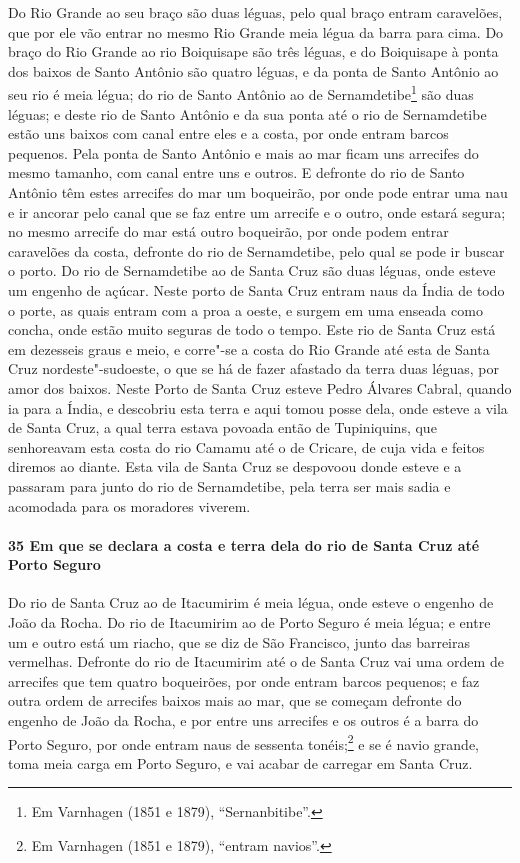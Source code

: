 Do Rio Grande ao seu braço são duas léguas, pelo qual braço entram caravelões, que por ele
vão entrar no mesmo Rio Grande meia légua da barra para cima. Do braço do Rio Grande ao
rio Boiquisape são três léguas, e do Boiquisape à ponta dos baixos de Santo Antônio são
quatro léguas, e da ponta de Santo Antônio ao seu rio é meia légua; do rio de Santo
Antônio ao de Sernamdetibe\footnote{ Em Varnhagen (1851 e 1879), ``Sernanbitibe''.} são
duas léguas; e deste rio de Santo Antônio e da sua ponta até o rio de Sernamdetibe estão
uns baixos com canal entre eles e a costa, por onde entram barcos pequenos. Pela ponta de
Santo Antônio e mais ao mar ficam uns arrecifes do mesmo tamanho, com canal entre uns e
outros. E defronte do rio de Santo Antônio têm estes arrecifes do mar um boqueirão, por
onde pode entrar uma nau e ir ancorar pelo canal que se faz entre um arrecife e o outro,
onde estará segura; no mesmo arrecife do mar está outro boqueirão, por onde podem entrar
caravelões da costa, defronte do rio de Sernamdetibe, pelo qual se pode ir buscar o porto.
Do rio de Sernamdetibe ao de Santa Cruz são duas léguas, onde esteve um engenho de açúcar.
Neste porto de Santa Cruz entram naus da Índia de todo o porte, as quais entram com a proa
a oeste, e surgem em uma enseada como concha, onde estão muito seguras de todo o tempo.
Este rio de Santa Cruz está em dezesseis graus e meio, e corre"-se a costa do Rio Grande
até esta de Santa Cruz nordeste"-sudoeste, o que se há de fazer afastado da terra duas
léguas, por amor dos baixos. Neste Porto de Santa Cruz esteve Pedro Álvares Cabral, quando
ia para a Índia, e descobriu esta terra e aqui tomou posse dela, onde esteve a vila de
Santa Cruz, a qual terra estava povoada então de Tupiniquins, que senhoreavam esta costa
do rio Camamu até o de Cricare, de cuja vida e feitos diremos ao diante. Esta vila de
Santa Cruz se despovoou donde esteve e a passaram para junto do rio de Sernamdetibe, pela
terra ser mais sadia e acomodada para os moradores viverem.

\paragraph{35 Em que se declara a costa e terra dela do rio de Santa Cruz até Porto
Seguro}

Do rio de Santa Cruz ao de Itacumirim é meia légua, onde esteve o engenho de João da
Rocha. Do rio de Itacumirim ao de Porto Seguro é meia légua; e entre um e outro está um
riacho, que se diz de São Francisco, junto das barreiras vermelhas. Defronte do rio de
Itacumirim até o de Santa Cruz vai uma ordem de arrecifes que tem quatro boqueirões, por
onde entram barcos pequenos; e faz outra ordem de arrecifes baixos mais ao mar, que se
começam defronte do engenho de João da Rocha, e por entre uns arrecifes e os outros é a
barra do Porto Seguro, por onde entram naus de sessenta tonéis;\footnote{ Em Varnhagen
(1851 e 1879), ``entram navios''.} e se é navio grande, toma meia carga em Porto Seguro, e
vai acabar de carregar em Santa Cruz.

